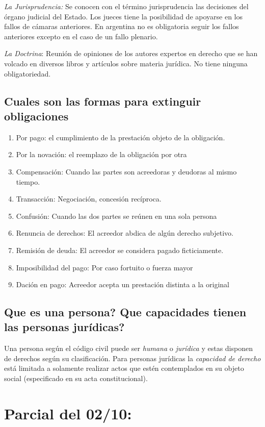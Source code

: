 \documentclass{article}
\begin{document}
\textit{La Jurisprudencia:} Se conocen con el término jurisprudencia las decisiones del órgano judicial del Estado. Los jueces tiene la posibilidad de apoyarse en los fallos de cámaras anteriores. En argentina no es obligatoria seguir los fallos anteriores excepto en el caso de un fallo plenario.

\textit{La Doctrina}: Reunión de opiniones  de los autores expertos en derecho que se han volcado en diversos libros y artículos sobre materia jurídica. No tiene ninguna obligatoriedad.

\subsection{Cuales son las formas para extinguir obligaciones}
\begin{enumerate}
\item Por pago: el cumplimiento de la prestación objeto de la obligación.
\item Por la novación: el reemplazo de la obligación por otra
\item Compensación: Cuando las partes son acreedoras y deudoras al mismo tiempo.
\item Transacción: Negociación, concesión recíproca. 
\item Confusión: Cuando las dos partes se reúnen en una sola persona
\item Renuncia de derechos: El acreedor abdica de algún derecho subjetivo.
\item Remisión de deuda: El acreedor se considera pagado ficticiamente. 
\item Imposibilidad del pago: Por caso fortuito o fuerza mayor
\item Dación en pago: Acreedor acepta un prestación distinta a la original
\end{enumerate}


\subsection{Que es una persona? Que capacidades tienen las personas jurídicas?}

Una persona según el código civil puede ser \textit{humana} o \textit{jurídica} y estas disponen de derechos según su clasificación. Para personas jurídicas la \textit{capacidad de derecho} está limitada a solamente realizar actos que estén contemplados en su objeto social (especificado en su acta constitucional). 

\section{Parcial del 02/10:}
\end{document}

